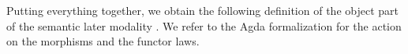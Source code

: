 {\begin{code}
\>[2]\AgdaSpace{}%
\AgdaSpace{}%
\AgdaSpace{}%
\AgdaSpace{}%
\AgdaSpace{}%
\AgdaOperator{\AgdaInductiveConstructor{[}}\AgdaSpace{}%
\AgdaSpace{}%
\AgdaOperator{\AgdaInductiveConstructor{]}}\AgdaSpace{}%
\AgdaOperator{\AgdaInductiveConstructor{[}}\AgdaSpace{}%
\AgdaSpace{}%
\AgdaOperator{\AgdaInductiveConstructor{]}}\AgdaSpace{}%
\AgdaSymbol{=}\AgdaSpace{}%
\AgdaSpace{}%
\AgdaOperator{\AgdaInductiveConstructor{[}}\AgdaSpace{}%
\AgdaSpace{}%
\AgdaOperator{\AgdaInductiveConstructor{]}}\AgdaSpace{}%
\AgdaOperator{\AgdaInductiveConstructor{[}}\AgdaSpace{}%
\AgdaSpace{}%
\AgdaOperator{\AgdaInductiveConstructor{]}}\<%
\end{code}
}
Putting everything  together, we obtain the following definition of the object part of the semantic later modality . We refer to the Agda formalization for the action on the morphisms and the functor laws.
\begin{code}%
\>[0]\AgdaSpace{}%
\AgdaSpace{}%
\AgdaSymbol{(}\AgdaSpace{}%
\AgdaSymbol{:}\AgdaSpace{}%
\AgdaSpace{}%
\AgdaSymbol{)}\AgdaSpace{}%
\AgdaSymbol{(}\AgdaSpace{}%
\AgdaSymbol{:}\AgdaSpace{}%
\AgdaSymbol{)}\AgdaSpace{}%
\AgdaSymbol{:}\AgdaSpace{}%
\AgdaSpace{}%
\<%
\\
\>[0][@{}l@{\AgdaIndent{0}}]%
\>[2]\<%
\\
\>[2][@{}l@{\AgdaIndent{0}}]%
\>[4]\AgdaSpace{}%
\AgdaSymbol{:}\AgdaSpace{}%
\AgdaSpace{}%
\AgdaSymbol{(}\AgdaSpace{}%
\AgdaSymbol{)}\AgdaSpace{}%
\<%
\\
%
\>[4]\AgdaSpace{}%
\AgdaSymbol{:}\AgdaSpace{}%
\AgdaSpace{}%
\AgdaSymbol{(}\AgdaSpace{}%
\AgdaSymbol{)}\AgdaSpace{}%
\AgdaSymbol{(}\AgdaSpace{}%
\AgdaSymbol{)}\AgdaSpace{}%
\AgdaSpace{}%
\<%
\end{code}

